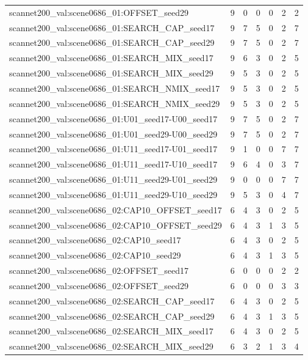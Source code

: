 \begin{table}[t]
\begin{tabular}{lrrrrrr}
scannet200\_val:scene0686\_01:OFFSET\_seed29 & 9 & 0 & 0 & 0 & 2 & 2 \\
scannet200\_val:scene0686\_01:SEARCH\_CAP\_seed17 & 9 & 7 & 5 & 0 & 2 & 7 \\
scannet200\_val:scene0686\_01:SEARCH\_CAP\_seed29 & 9 & 7 & 5 & 0 & 2 & 7 \\
scannet200\_val:scene0686\_01:SEARCH\_MIX\_seed17 & 9 & 6 & 3 & 0 & 2 & 5 \\
scannet200\_val:scene0686\_01:SEARCH\_MIX\_seed29 & 9 & 5 & 3 & 0 & 2 & 5 \\
scannet200\_val:scene0686\_01:SEARCH\_NMIX\_seed17 & 9 & 5 & 3 & 0 & 2 & 5 \\
scannet200\_val:scene0686\_01:SEARCH\_NMIX\_seed29 & 9 & 5 & 3 & 0 & 2 & 5 \\
scannet200\_val:scene0686\_01:U01\_seed17-U00\_seed17 & 9 & 7 & 5 & 0 & 2 & 7 \\
scannet200\_val:scene0686\_01:U01\_seed29-U00\_seed29 & 9 & 7 & 5 & 0 & 2 & 7 \\
scannet200\_val:scene0686\_01:U11\_seed17-U01\_seed17 & 9 & 1 & 0 & 0 & 7 & 7 \\
scannet200\_val:scene0686\_01:U11\_seed17-U10\_seed17 & 9 & 6 & 4 & 0 & 3 & 7 \\
scannet200\_val:scene0686\_01:U11\_seed29-U01\_seed29 & 9 & 0 & 0 & 0 & 7 & 7 \\
scannet200\_val:scene0686\_01:U11\_seed29-U10\_seed29 & 9 & 5 & 3 & 0 & 4 & 7 \\
scannet200\_val:scene0686\_02:CAP10\_OFFSET\_seed17 & 6 & 4 & 3 & 0 & 2 & 5 \\
scannet200\_val:scene0686\_02:CAP10\_OFFSET\_seed29 & 6 & 4 & 3 & 1 & 3 & 5 \\
scannet200\_val:scene0686\_02:CAP10\_seed17 & 6 & 4 & 3 & 0 & 2 & 5 \\
scannet200\_val:scene0686\_02:CAP10\_seed29 & 6 & 4 & 3 & 1 & 3 & 5 \\
scannet200\_val:scene0686\_02:OFFSET\_seed17 & 6 & 0 & 0 & 0 & 2 & 2 \\
scannet200\_val:scene0686\_02:OFFSET\_seed29 & 6 & 0 & 0 & 0 & 3 & 3 \\
scannet200\_val:scene0686\_02:SEARCH\_CAP\_seed17 & 6 & 4 & 3 & 0 & 2 & 5 \\
scannet200\_val:scene0686\_02:SEARCH\_CAP\_seed29 & 6 & 4 & 3 & 1 & 3 & 5 \\
scannet200\_val:scene0686\_02:SEARCH\_MIX\_seed17 & 6 & 4 & 3 & 0 & 2 & 5 \\
scannet200\_val:scene0686\_02:SEARCH\_MIX\_seed29 & 6 & 3 & 2 & 1 & 3 & 4 \\

\end{tabular}
\end{table}
